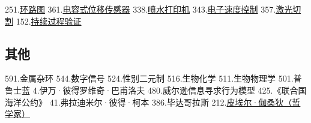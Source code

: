 251.\href{https://wuli.wiki/assets/sogou/251.\%E7\%8E\%AF\%E8\%B7\%AF\%E5\%9B\%BE\%20-\%20\%E6\%90\%9C\%E7\%8B\%97\%E7\%A7\%91\%E5\%AD\%A6\%E7\%99\%BE\%E7\%A7\%91.html}{环路图}
361.\href{https://wuli.wiki/assets/sogou/361.\%E7\%94\%B5\%E5\%AE\%B9\%E5\%BC\%8F\%E4\%BD\%8D\%E7\%A7\%BB\%E4\%BC\%A0\%E6\%84\%9F\%E5\%99\%A8\%20-\%20\%E6\%90\%9C\%E7\%8B\%97\%E7\%A7\%91\%E5\%AD\%A6\%E7\%99\%BE\%E7\%A7\%91.html}{电容式位移传感器}
338.\href{https://wuli.wiki/assets/sogou/338.\%E5\%96\%B7\%E6\%B0\%B4\%E6\%89\%93\%E5\%8D\%B0\%E6\%9C\%BA\%20-\%20\%E6\%90\%9C\%E7\%8B\%97\%E7\%A7\%91\%E5\%AD\%A6\%E7\%99\%BE\%E7\%A7\%91.html}{喷水打印机}
343.\href{https://wuli.wiki/assets/sogou/343.\%E7\%94\%B5\%E5\%AD\%90\%E9\%80\%9F\%E5\%BA\%A6\%E6\%8E\%A7\%E5\%88\%B6\%20-\%20\%E6\%90\%9C\%E7\%8B\%97\%E7\%A7\%91\%E5\%AD\%A6\%E7\%99\%BE\%E7\%A7\%91.html}{电子速度控制}
357.\href{https://wuli.wiki/assets/sogou/357.\%E6\%BF\%80\%E5\%85\%89\%E5\%88\%87\%E5\%89\%B2\%20-\%20\%E6\%90\%9C\%E7\%8B\%97\%E7\%A7\%91\%E5\%AD\%A6\%E7\%99\%BE\%E7\%A7\%91.html}{激光切割}
152.\href{https://wuli.wiki/assets/sogou/152.\%E6\%8C\%81\%E7\%BB\%AD\%E8\%BF\%87\%E7\%A8\%8B\%E9\%AA\%8C\%E8\%AF\%81\%20-\%20\%E6\%90\%9C\%E7\%8B\%97\%E7\%A7\%91\%E5\%AD\%A6\%E7\%99\%BE\%E7\%A7\%91.html}{持续过程验证}

\subsection{其他}
591.金属杂环 
544.数字信号
524.性别二元制
516.生物化学
511.生物物理学
501.普鲁士蓝
4.伊万·彼得罗维奇·巴甫洛夫
480.威尔逊信息寻求行为模型
425.《联合国海洋公约》
41.弗拉迪米尔·彼得·柯本
386.毕达哥拉斯
212.\href{https://wuli.wiki/assets/sogou/212.\%E7\%9A\%AE\%E5\%9F\%83\%E5\%B0\%94\%C2\%B7\%E4\%BC\%BD\%E6\%A1\%91\%E7\%8B\%84\%20-\%20\%E6\%90\%9C\%E7\%8B\%97\%E7\%A7\%91\%E5\%AD\%A6\%E7\%99\%BE\%E7\%A7\%91.html}{皮埃尔·伽桑狄（哲学家）}

